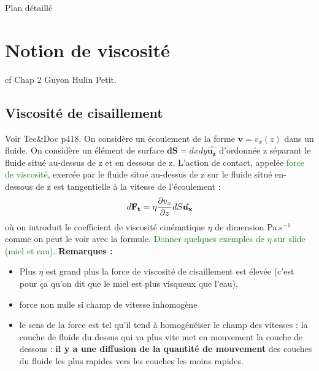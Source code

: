 \begin{reportBlock}{Plan détaillé}
  \section{Notion de viscosité}
cf Chap 2 Guyon Hulin Petit.
\subsection{Viscosité de cisaillement}
Voir Tec\&Doc p418. On considère un écoulement de la forme $\mathbf{v}=v_x(z)$ dans un fluide. On considère un élément de surface $\mathbf{dS}=dxdy\mathbf{\hat{u_z}}$ d'ordonnée z séparant le fluide situé au-dessus de z et en dessous de z. L'action de contact, appelée \textcolor{green}{force de viscosité}, exercée par le fluide situé au-dessus de z sur le fluide situé en-dessous de z est tangentielle à la vitesse de l'écoulement :
\begin{equation}
    d\mathbf{F_t} = \eta\frac{\partial v_x}{\partial z}dS\mathbf{\hat{u_x}}
\end{equation}
où on introduit le coefficient de viscosité cinématique $\eta$ de dimension Pa.s$^{-1}$ comme on peut le voir avec la formule. \textcolor{green}{Donner quelques exemples de $\eta$ sur slide (miel et eau)}. 
\textbf{Remarques :}
\begin{itemize}
    \item Plus $\eta$ est grand plus la force de viscosité de cisaillement est élevée (c'est pour ça qu'on dit que le miel est plus visqueux que l'eau),
    \item force non nulle si champ de vitesse inhomogène
    \item le sens de la force est tel qu'il tend à homogénéiser le champ des vitesses : la couche de fluide du dessus qui va plus vite met en mouvement la couche de dessous : \textbf{il y a une diffusion de la quantité de mouvement} des couches du fluide les plus rapides vers les couches les moins rapides.
\end{itemize} 


\end{reportBlock}

